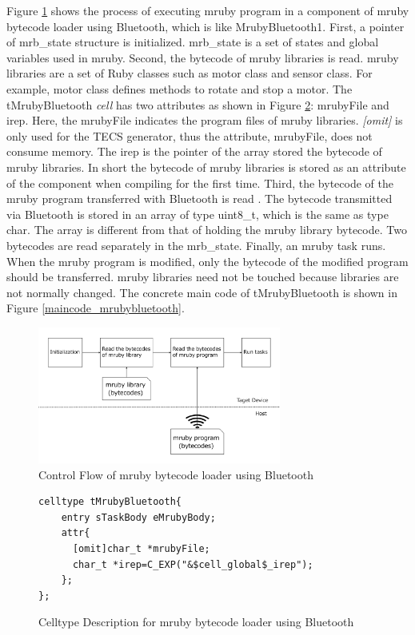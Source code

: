 \documentclass[conference,compsoc]{IEEEtran}
\begin{document}
Figure \ref{fig:control_flow} shows the process of executing mruby program in a component of mruby bytecode loader using Bluetooth, which is like MrubyBluetooth1.
First, a pointer of mrb\_state structure is initialized.
mrb\_state is a set of states and global variables used in mruby.
Second, the bytecode of mruby libraries is read.
mruby libraries are a set of Ruby classes such as motor class and sensor class.
For example, motor class defines methods to rotate and stop a motor.
The tMrubyBluetooth {\it cell} has two attributes as shown in Figure \ref{celltype_mrubybluetooth}: mrubyFile and irep.
Here, the mrubyFile indicates the program files of mruby libraries.
{\it [omit]} is only used for the TECS generator, thus the attribute, mrubyFile, does not consume memory.
The irep is the pointer of the array stored the bytecode of mruby libraries.
In short the bytecode of mruby libraries is stored as an attribute of the component when compiling for the first time.
Third, the bytecode of the mruby program transferred with Bluetooth is read .
The bytecode transmitted via Bluetooth is stored in an array of type uint8\_t, which is the same as type char.
The array is different from that of holding the mruby library bytecode.
Two bytecodes are read separately in the mrb\_state.
Finally, an mruby task runs.
When the mruby program is modified, only the bytecode of the modified program should be transferred.
mruby libraries need not be touched because libraries are not normally changed.
The concrete main code of tMrubyBluetooth is shown in Figure \ref{maincode_mrubybluetooth}.
\begin{figure}[t]
    \centering
    \includegraphics[width=8cm,clip]{figure/control_flow.pdf}
    \caption{Control Flow of mruby bytecode loader using Bluetooth}
    \label{fig:control_flow}
\end{figure}
\begin{figure}[t]
\centering
\begin{lstlisting}
celltype tMrubyBluetooth{
    entry sTaskBody eMrubyBody;
    attr{
      [omit]char_t *mrubyFile;
      char_t *irep=C_EXP("&$cell_global$_irep");
    };
};
\end{lstlisting}
\caption{Celltype Description for mruby bytecode loader using Bluetooth}
\label{celltype_mrubybluetooth}
\end{figure}
\end{document}
